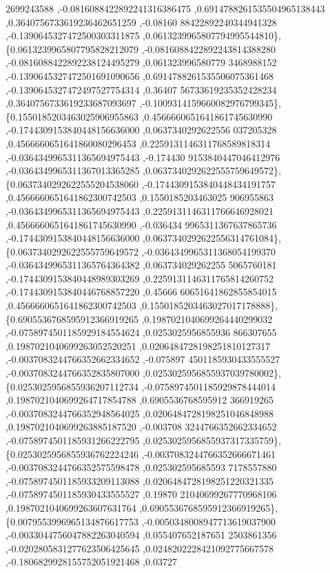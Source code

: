 \begin{DoxyCode}
      2699243588 ,-0.0816088422892241316386475 ,0.6914788261535504965138443 ,0.3640756733619236462651259 ,-0.08160
      88422892240344941328 ,-0.1390645327472500303311875 ,0.0613239965807794995544810\},
\{0.0613239965807795828212079 ,-0.0816088422892243814388280 ,-0.0816088422892238124495279 ,0.061323996580779
      3468988152 ,-0.1390645327472501691090656 ,0.6914788261535506075361468 ,-0.1390645327472497527754314 ,0.36407
      56733619235352428234 ,0.3640756733619233687093697 ,-0.1009314159660082976799345\},
\{0.1550185203463025906955863 ,0.4566660651641861745630990 ,-0.1744309153840448156636000 ,0.0637340292622556
      037205328 ,0.4566660651641860080296453 ,0.2259131146311768589818314 ,-0.0364349965311365694975443 ,-0.174430
      9153840447046412976 ,-0.0364349965311367013365285 ,0.0637340292622555759649572\},
\{0.0637340292622555204538060 ,-0.1744309153840448434191757 ,0.4566660651641862300742503 ,0.1550185203463025
      906955863 ,-0.0364349965311365694975443 ,0.2259131146311766646928021 ,0.4566660651641861745630990 ,-0.036434
      9965311367637865736 ,-0.1744309153840448156636000 ,0.0637340292622556314761084\},
\{0.0637340292622555759649572 ,-0.0364349965311368054199370 ,-0.0364349965311365764364382 ,0.063734029262255
      5065760181 ,-0.1744309153840448989303269 ,0.2259131146311765814260752 ,-0.1744309153840446768857220 ,0.45666
      60651641862855854015 ,0.4566660651641862300742503 ,0.1550185203463027017178888\},
\{0.6905536768595912366919265 ,0.1987021040699264440299032 ,-0.0758974501185929184554624 ,0.0253025956855936
      866307655 ,0.1987021040699263052520251 ,0.0206484728198251810127317 ,-0.0037083244766352662334652 ,-0.075897
      4501185930433555527 ,-0.0037083244766352835807000 ,0.0253025956855937039780002\},
\{0.0253025956855936207112734 ,-0.0758974501185929878444014 ,0.1987021040699264717854788 ,0.6905536768595912
      366919265 ,-0.0037083244766352948564025 ,0.0206484728198251046848988 ,0.1987021040699263885187520 ,-0.003708
      3244766352662334652 ,-0.0758974501185931266222795 ,0.0253025956855937317335759\},
\{0.0253025956855936762224246 ,-0.0037083244766352666671461 ,-0.0037083244766352575598478 ,0.025302595685593
      7178557880 ,-0.0758974501185933209113088 ,0.0206484728198251220321335 ,-0.0758974501185930433555527 ,0.19870
      21040699267770968106 ,0.1987021040699263607631764 ,0.6905536768595912366919265\},
\{0.0079553996965134876617753 ,-0.0050348008947713619037900 ,-0.0033044756047882263040594 ,0.055407652187651
      2503861356 ,-0.0202805831277623506425645 ,0.0248202228421092775667578 ,-0.1806829928155752051921468 ,0.03727

\end{DoxyCode}
